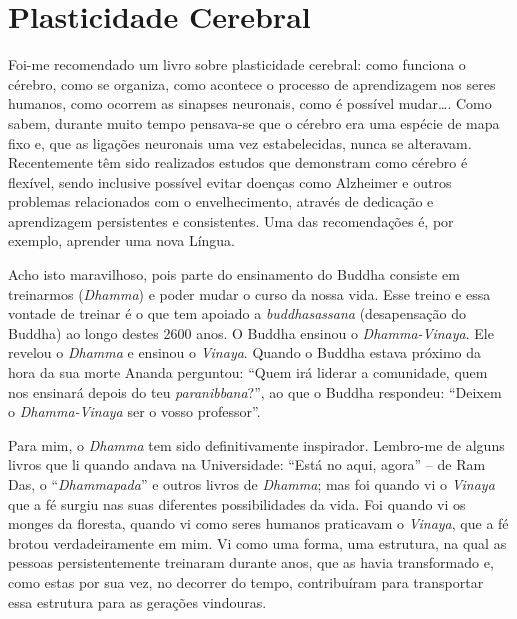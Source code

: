 \chapter{Plasticidade Cerebral}

Foi-me recomendado um livro sobre plasticidade cerebral: como funciona o
cérebro, como se organiza, como acontece o processo de aprendizagem nos
seres humanos, como ocorrem as sinapses neuronais, como é possível
mudar\ldots{}. Como sabem, durante muito tempo pensava-se que o cérebro
era uma espécie de mapa fixo e, que as ligações neuronais uma vez
estabelecidas, nunca se alteravam. Recentemente têm sido realizados
estudos que demonstram como cérebro é flexível, sendo inclusive possível
evitar doenças como Alzheimer e outros problemas relacionados com o
envelhecimento, através de dedicação e aprendizagem persistentes e
consistentes. Uma das recomendações é, por exemplo, aprender uma nova
Língua.

Acho isto maravilhoso, pois parte do ensinamento do Buddha consiste em
treinarmos (\emph{Dhamma}) e poder mudar o curso da nossa vida. Esse
treino e essa vontade de treinar é o que tem apoiado a
\emph{buddhasassana} (desapensação do Buddha) ao longo destes 2600 anos.
O Buddha ensinou o \emph{Dhamma-Vinaya}. Ele revelou o \emph{Dhamma} e
ensinou o \emph{Vinaya}. Quando o Buddha estava próximo da hora da sua
morte Ananda perguntou: ``Quem irá liderar a comunidade, quem nos
ensinará depois do teu \emph{paranibbana}?'', ao que o Buddha respondeu:
``Deixem o \emph{Dhamma-Vinaya} ser o vosso professor''.

Para mim, o \emph{Dhamma} tem sido definitivamente inspirador. Lembro-me
de alguns livros que li quando andava na Universidade: ``Está no aqui,
agora'' -- de Ram Das, o ``\emph{Dhammapada}'' e outros livros de
\emph{Dhamma}; mas foi quando vi o \emph{Vinaya} que a fé surgiu nas
suas diferentes possibilidades da vida. Foi quando vi os monges da
floresta, quando vi como seres humanos praticavam o \emph{Vinaya}, que a
fé brotou verdadeiramente em mim. Vi como uma forma, uma estrutura, na
qual as pessoas persistentemente treinaram durante anos, que as havia
transformado e, como estas por sua vez, no decorrer do tempo,
contribuíram para transportar essa estrutura para as gerações vindouras.

